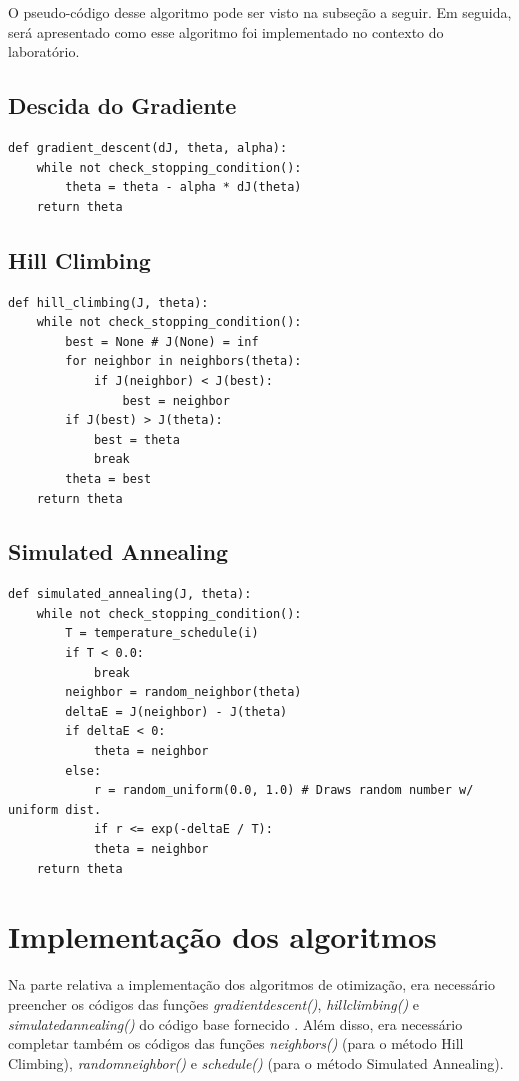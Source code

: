 \documentclass[conference]{IEEEtran}
\begin{document}
O pseudo-código desse algoritmo pode ser visto na subseção a seguir. Em seguida, será apresentado como esse algoritmo foi implementado no contexto do laboratório.

\subsection{Descida do Gradiente}
\begin{lstlisting}
def gradient_descent(dJ, theta, alpha):
	while not check_stopping_condition():
		theta = theta - alpha * dJ(theta)
	return theta
\end{lstlisting}

\subsection{Hill Climbing}
\begin{lstlisting}
def hill_climbing(J, theta):
	while not check_stopping_condition():
		best = None # J(None) = inf
		for neighbor in neighbors(theta):
			if J(neighbor) < J(best):
				best = neighbor
		if J(best) > J(theta):
			best = theta
			break
		theta = best
	return theta
\end{lstlisting}

\subsection{Simulated Annealing}
\begin{lstlisting}
def simulated_annealing(J, theta):
	while not check_stopping_condition():
		T = temperature_schedule(i)
		if T < 0.0:
			break
		neighbor = random_neighbor(theta)
		deltaE = J(neighbor) - J(theta)
		if deltaE < 0:
			theta = neighbor
		else:
			r = random_uniform(0.0, 1.0) # Draws random number w/ uniform dist.
			if r <= exp(-deltaE / T):
			theta = neighbor
	return theta
\end{lstlisting}

\section{Implementação dos algoritmos}
Na parte relativa a implementação dos algoritmos de otimização, era necessário preencher os códigos das funções \textit{gradient\underline{\space}descent()}, \textit{hill\underline{\space}climbing()} e \textit{simulated\underline{\space}annealing()} do código base fornecido \cite{b1}.  Além disso, era necessário completar também os códigos das funções \textit{neighbors()} (para o método Hill Climbing), \textit{random\underline{\space}neighbor()} e \textit{schedule()} (para o método Simulated Annealing). 
\end{document}
